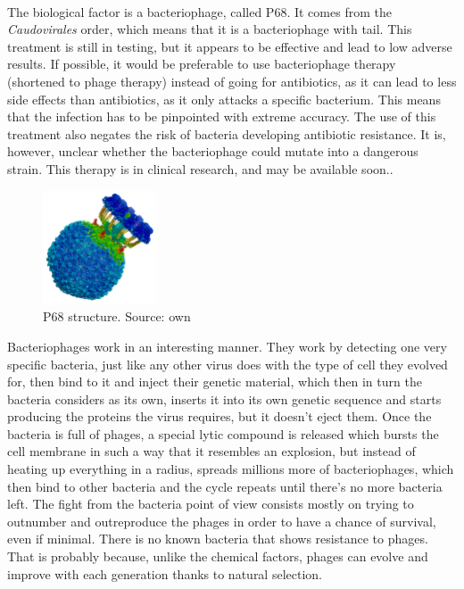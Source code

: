 \paragraph{}The biological factor is a bacteriophage, called P68. It comes from the \emph{Caudovirales} order, which means that it is a bacteriophage with tail.  This treatment is still in testing, but it appears to be effective and lead to low adverse results. If possible, it would be preferable to use bacteriophage therapy (shortened to phage therapy) instead of going for antibiotics, as it can lead to less side effects than antibiotics, as it only attacks a specific bacterium. This means that the infection has to be pinpointed with extreme accuracy. The use of this treatment also negates the risk of bacteria developing antibiotic resistance. It is, however, unclear whether the bacteriophage could mutate into a dangerous strain. This therapy is in clinical research, and may be available soon.\cite{zhouReviewNanosystemsEffective2018}.
\newpage{}\begin{figure}\begin{center}\includegraphics[width=0.30\textwidth]{assets/staph_side.png}\end{center}\caption{P68 structure. Source: own}\end{figure}Bacteriophages work in an interesting manner. They work by detecting one very specific bacteria, just like any other virus does with the type of cell they evolved for, then bind to it and inject their genetic material, which then in turn the bacteria considers as its own, inserts it into its own genetic sequence and starts producing the proteins the virus requires, but it doesn't eject them. Once the bacteria is full of phages, a special lytic compound is released which bursts the cell membrane in such a way that it resembles an explosion, but instead of heating up everything in a radius, spreads millions more of bacteriophages, which then bind to other bacteria and the cycle repeats until there's no more bacteria left. The fight from the bacteria point of view consists mostly on trying to outnumber and outreproduce the phages in order to have a chance of survival, even if minimal. There is no known bacteria that shows resistance to phages. That is probably because, unlike the chemical factors, phages can evolve and improve with each generation thanks to natural selection\cite{hrebikStructureGenomeEjection2019a}.


